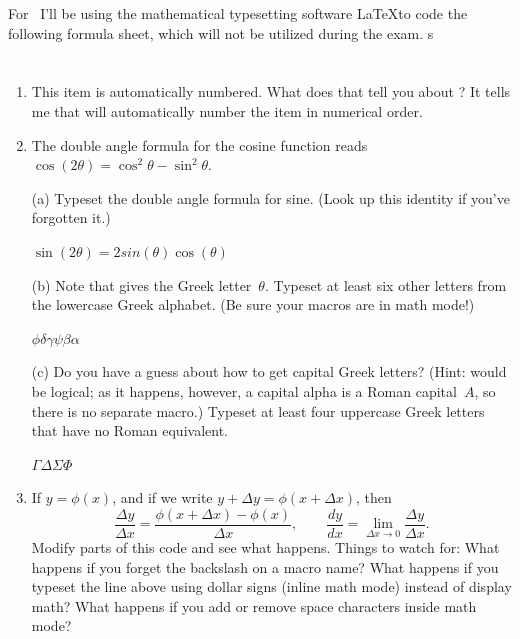 For \Course\ I'll be using the mathematical typesetting software
\LaTeX to code the following formula sheet, which will not be utilized during the exam. 
s

\section{}
\begin{enumerate}

\item This item is automatically numbered. What does that tell you
  about ?
\soln It tells me that  will automatically number the item in numerical order. 

\item The double angle formula for the cosine function reads
  $\cos(2\theta) = \cos^{2}\theta - \sin^{2}\theta$.

  (a) Typeset the double angle formula for sine. (Look up this
  identity if you've forgotten it.)

  \soln $\sin(2\theta) = 2sin(\theta)\cos(\theta)$

  (b) Note that  gives the Greek letter~$\theta$. Typeset
  at least six other letters from the lowercase Greek alphabet. (Be
  sure your macros are in math mode!)

  \soln $\phi\delta\gamma\psi\beta\alpha$

  (c) Do you have a guess about how to get capital Greek letters?
  (Hint:  would be logical; as it happens, however, a
  capital alpha is a Roman capital~$A$, so there is no separate
  macro.) Typeset at least four uppercase Greek letters that have no
  Roman equivalent.

  \soln $\Gamma\Delta\Sigma\Phi$

\item If $y = \phi(x)$, and if we write $y + \Delta y = \phi(x + \Delta x)$,
  then
  \[ 
  \frac{\Delta y}{\Delta x} = \frac{\phi(x + \Delta x) - \phi(x)}{\Delta x},
  \qquad
  \frac{dy}{dx} = \lim_{\Delta x \to 0} \frac{\Delta y}{\Delta x}.
  \] 
  Modify parts of this code and see what happens. Things to watch for:
  What happens if you forget the backslash on a macro name? What
  happens if you typeset the line above using dollar signs (inline
  math mode) instead of display math? What happens if you add or
  remove space characters inside math mode?


\end{enumerate}
